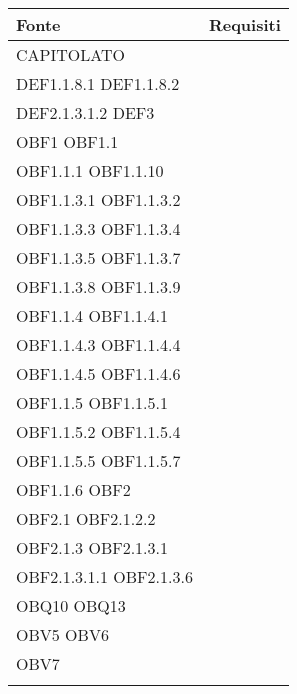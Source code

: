 \documentclass{scalatekids-article}
\begin{document}
\begin{longtable}[H]{|p{5.5cm}|p{5.5cm}|}
  \hline
  \textbf{Fonte} & \textbf{Requisiti}\\
  \hline
  CAPITOLATO & \multiLineCell[t]{DEF1.1.7 DEF1.1.8\\DEF1.1.8.1 DEF1.1.8.2\\DEF2.1.3.1.2 DEF3\\OBF1 OBF1.1\\OBF1.1.1 OBF1.1.10\\OBF1.1.3.1 OBF1.1.3.2\\OBF1.1.3.3 OBF1.1.3.4\\OBF1.1.3.5 OBF1.1.3.7\\OBF1.1.3.8 OBF1.1.3.9\\OBF1.1.4 OBF1.1.4.1\\OBF1.1.4.3 OBF1.1.4.4\\OBF1.1.4.5 OBF1.1.4.6\\OBF1.1.5 OBF1.1.5.1\\OBF1.1.5.2 OBF1.1.5.4\\OBF1.1.5.5 OBF1.1.5.7\\OBF1.1.6 OBF2\\OBF2.1 OBF2.1.2.2\\OBF2.1.3 OBF2.1.3.1\\OBF2.1.3.1.1 OBF2.1.3.6\\OBQ10 OBQ13\\OBV5 OBV6\\OBV7\\}\\
  \hline

\end{longtable}
\end{document}
